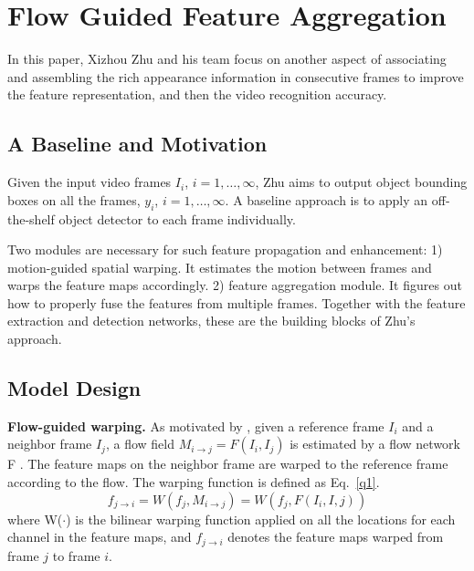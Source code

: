 \documentclass[10pt,twocolumn,letterpaper]{article}
\begin{document}
\section{Flow Guided Feature Aggregation}

In this paper, Xizhou Zhu and his team focus on another aspect of associating and assembling the rich appearance information in consecutive frames to improve the feature representation, and then the video recognition accuracy.

\subsection{A Baseline and Motivation}

Given the input video frames ${I_i}$, $i = 1,\ldots,\infty$, Zhu aims to output object bounding boxes on all the frames, ${y_i}$, $i = 1,\ldots,\infty$. A baseline approach is to apply an off-the-shelf object detector to each frame individually.

Two modules are necessary for such feature propagation and enhancement: 1) motion-guided spatial warping. It estimates the motion between frames and warps the feature maps accordingly. 2) feature aggregation module. It figures out how to properly fuse the features from multiple frames. Together with the feature extraction and detection networks, these are the building blocks of Zhu's approach.

\subsection{Model Design}

{\bfseries Flow-guided warping.} As motivated by \cite{Zhu2017Deep}, given a reference frame $I_i$ and a neighbor frame $I_j$, a flow field $M_{i\to j} = F(I_i, I_j)$ is estimated by a flow network F \cite{Dosovitskiy2015FlowNet}. The feature maps on the neighbor frame are warped to the reference frame according to the flow. The warping function is defined as Eq.~\ref{q1}.
\begin{equation}
f_{j\to i }=W(f_j,M_{i\to j})=W(f_j,F(I_i,I,j)) \label{q1}
\end{equation}
where W($\cdot$) is the bilinear warping function applied on all the locations for each channel in the feature maps, and $f_{j\to i }$ denotes the feature maps warped from frame $j$ to frame $i$.
\end{document}
